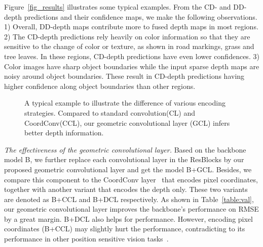 \documentclass[letterpaper, 10 pt, conference]{ieeeconf}
\begin{document}
Figure~\ref{fig_results} illustrates some typical examples. From the CD- and DD-depth predictions and their confidence maps, we make the following observations. 1) Overall, DD-depth maps contribute more to fused depth maps in most regions. 2) The CD-depth predictions rely heavily on color information so that they are sensitive to the change of color or texture, as shown in road markings, grass and tree leaves. In these regions, CD-depth predictions have even lower confidences. 3) Color images have sharp object boundaries while the input sparse depth maps are noisy around object boundaries. These result in CD-depth predictions having higher confidence along object boundaries than other regions.






\begin{figure}[th]
	\centering
	\vspace{0cm}
	\subfigtopskip=3pt
	\subfigbottomskip=-10pt
	
	
	
	
	
	
	
	\caption{A typical example to illustrate the difference of various encoding strategies. Compared to standard convolution(CL) and CoordConv(CCL), our geometric convolutional layer (GCL) infers better depth information.}\label{fig_gcl}
\end{figure}


\textit{The effectiveness of the geometric convolutional layer.} Based on the backbone model B, we further replace each convolutional layer in the ResBlocks by our proposed geometric convolutional layer and get the model B+GCL. Besides, we compare this component to the CoordConv layer~\cite{Liu2018Coordconv} that encodes pixel coordinates, together with another variant that encodes the depth only. These two variants are denoted as B+CCL and B+DCL respectively. As shown in Table~\ref{table:val}, our geometric convolutional layer improves the backbone's performance on RMSE by a great margin. B+DCL also helps for performance. However, encoding pixel coordinates (B+CCL) may slightly hurt the performance, contradicting to its performance in other position sensitive vision tasks~\cite{Wang2020SOLO,Choi2020fly}.
\end{document}
